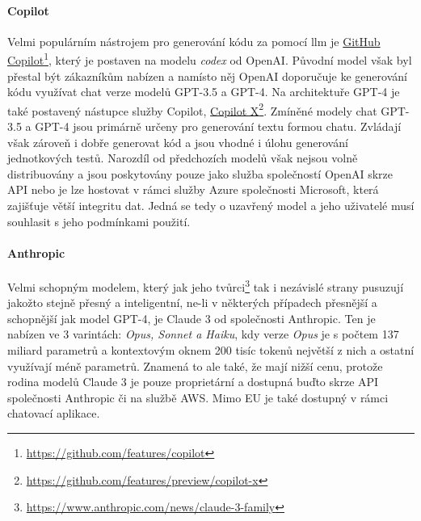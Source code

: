 \documentclass[czech, ma, kiv, he, iso690numb, pdf, viewonly]{fasthesis}
\begin{document}
    \paragraph{Copilot} Velmi populárním nástrojem pro generování kódu za pomocí \gls{llm} je \href{https://github.com/features/copilot}{GitHub Copilot}\footnote{\url{https://github.com/features/copilot}}, který je postaven na modelu \textit{codex} od OpenAI. Původní model však byl přestal být zákazníkům nabízen a namísto něj OpenAI doporučuje ke generování kódu využívat chat verze modelů GPT-3.5 a GPT-4. Na architektuře GPT-4 je také postavený nástupce služby Copilot, \href{https://github.com/features/preview/copilot-x}{Copilot X}\footnote{\url{https://github.com/features/preview/copilot-x}}. Zmíněné modely chat GPT-3.5 a GPT-4 jsou primárně určeny pro generování textu formou chatu. Zvládají však zároveň i dobře generovat kód a jsou vhodné i úlohu generování jednotkových testů. \cite{openai2024gpt4} Narozdíl od předchozích modelů však nejsou volně distribuovány a jsou poskytovány pouze jako služba společností OpenAI skrze API nebo je lze hostovat v rámci služby Azure společnosti Microsoft, která zajišťuje větší integritu dat. Jedná se tedy o uzavřený model a jeho uživatelé musí souhlasit s jeho podmínkami použití.

    \paragraph{Anthropic} Velmi schopným modelem, který jak jeho tvůrci\footnote{\url{https://www.anthropic.com/news/claude-3-family}} tak i nezávislé strany pusuzují jakožto stejně přesný a inteligentní, ne-li v některých případech přesnější a schopnější jak model GPT-4, je Claude 3 od společnosti Anthropic. \cite{kevian2024capabilities} Ten je nabízen ve 3 varintách: \textit{Opus, Sonnet a Haiku}, kdy verze \textit{Opus} je s počtem 137 miliard parametrů a kontextovým oknem 200 tisíc tokenů největší z nich a ostatní využívají méně parametrů. Znamená to ale také, že mají nižší cenu, protože rodina modelů Claude 3 je pouze proprietární a dostupná buďto skrze API společnosti Anthropic či na službě AWS. Mimo EU je také dostupný v rámci chatovací aplikace. \cite{anthropic2023claude}
\end{document}
